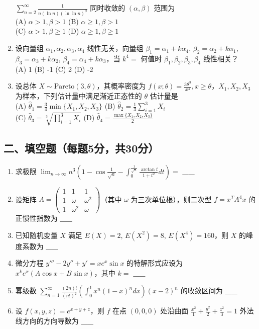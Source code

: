\documentclass[UTF8]{ctexart}
\begin{document}
\begin{enumerate}
  \( \sum_{n=2}^{\infty} \frac{1}{n(\ln n)(\ln\ln n)^{\beta}} \)
  同时收敛的 \( (\alpha,\beta) \) 范围为\\
  (A) \( \alpha > 1, \beta > 1 \) (B) \( \alpha \geq 1, \beta > 1 \) \\
  (C) \( \alpha > 1, \beta \geq 1 \) (D)
  \( \alpha \geq 1, \beta \geq 1 \)
\item
  设向量组 \( \alpha_1, \alpha_2, \alpha_3, \alpha_4 \) 线性无关，向量组
  \( \beta_1 = \alpha_1 + k\alpha_4 \),
  \( \beta_2 = \alpha_2 + k\alpha_1 \),
  \( \beta_3 = \alpha_3 + k\alpha_2 \),
  \( \beta_4 = \alpha_4 + k\alpha_3 \)，当 \( k^4 = \) 何值时
  \( \beta_1, \beta_2, \beta_3, \beta_4 \) 线性相关？\\
  (A) 1 (B) -1 (C) 2 (D) -2
\item
  设总体 \( X \sim \text{Pareto}(3,\theta) \)，其概率密度为
  \( f(x;\theta) = \frac{3\theta^3}{x^4}, x \geq \theta \)，\( X_1,X_2,X_3 \)
  为样本，下列估计量中满足渐近正态性的 \( \theta \) 估计量是\\
  (A) \( \hat{\theta}_1 = \frac{3}{4} \min\{X_1,X_2,X_3\} \) (B)
  \( \hat{\theta}_2 = \frac{1}{3} \sum_{i=1}^3 X_i \)\\
  (C) \( \hat{\theta}_3 = \sqrt[3]{\prod_{i=1}^3 X_i} \) (D)
  \( \hat{\theta}_4 = \frac{\max\{X_1,X_2,X_3\}}{2} \)
\end{enumerate}

\subsection{二、填空题（每题5分，共30分）}\label{ux4e8cux586bux7a7aux9898ux6bcfux98985ux5206ux517130ux5206uxff09}

\begin{enumerate}
\def\labelenumi{\arabic{enumi}.}
\item
  求极限
  \( \lim_{n \to \infty} n^3 \left(1 - \cos\frac{1}{\sqrt{n}} - \int_0^{\frac{1}{\sqrt{n}}} \frac{\arctan t}{1+t^2} dt\right) = \)
  \textbf{\_\_}
\item
  设矩阵 \( A = \begin{pmatrix} 
  1 & 1 & 1 \\
  1 & \omega & \omega^2 \\
  1 & \omega^2 & \omega 
  \end{pmatrix} \)（其中 \( \omega \) 为三次单位根），则二次型
  \( f = x^T A^4 x \) 的正惯性指数为 \textbf{\_\_}
\item
  已知随机变量 \( X \) 满足 \( E(X) = 2 \), \( E(X^2) = 8 \),
  \( E(X^4) = 160 \)，则 \( X \) 的峰度系数为 \textbf{\_\_}
\item
  微分方程 \( y''' - 2y'' + y' = x e^x \sin x \) 的特解形式应设为
  \( x^k e^x (A\cos x + B\sin x) \)，其中 \( k = \) \textbf{\_\_}
\item
  幂级数
  \( \sum_{n=1}^{\infty} \frac{(2n)!}{(n!)^2} \left(\int_0^1 x^n (1-x)^n dx\right) (x-2)^n \)
  的收敛区间为 \textbf{\_\_}
\item
  设 \( f(x,y,z) = e^{x+y+z} \)，则 \( f \) 在点 \( (0,0,0) \) 处沿曲面
  \( \frac{x^2}{1} + \frac{y^2}{2} + \frac{z^2}{3} = 1 \)
  外法线方向的方向导数为 \textbf{\_\_}
\end{enumerate}
\end{document}
